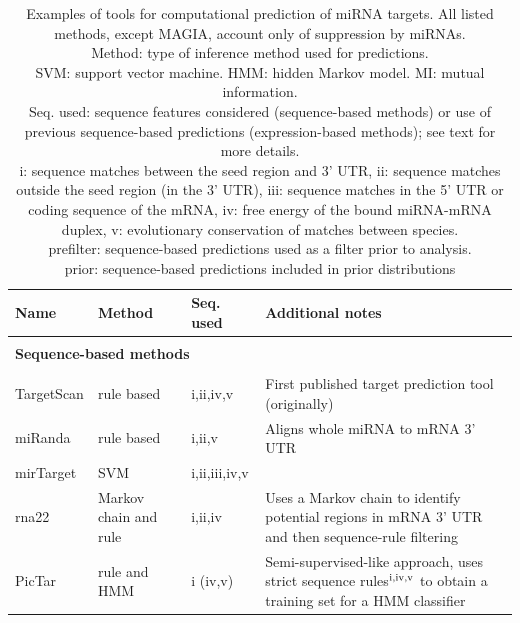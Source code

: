 \begin{table}
  \caption{Examples of tools for computational prediction of miRNA targets. All listed methods,
  except MAGIA, account only of suppression by miRNAs. \\
  Method: type of inference method used for predictions. \\
  SVM: support vector machine. HMM: hidden Markov model. MI: mutual information. \\
  Seq. used: sequence features considered (sequence-based methods) or use of
  previous sequence-based predictions (expression-based methods); see text for more details. \\
  i: sequence matches between the seed region and 3' UTR,
  ii: sequence matches outside the seed region (in the 3' UTR),
  iii: sequence matches in the 5' UTR or coding sequence of the mRNA,
  iv: free energy of the bound miRNA-mRNA duplex,
  v: evolutionary conservation of matches between species. \\
  prefilter: sequence-based predictions used as a filter prior to analysis. \\
  prior: sequence-based predictions included in prior distributions
  }
  \label{table:prediction-methods}
  {\fontsize{10pt}{13pt}\selectfont
  \begin{tabular}{ lp{3cm}lp{5cm} }
    \hline
    \textbf{Name} & \textbf{Method} & \textbf{Seq. used} & \textbf{Additional notes} \\
    \hline \\
    \multicolumn{4}{l}{\textbf{Sequence-based methods}} \\
    \\[-.3cm]
    TargetScan \citep{Agarwal2015}  & rule based            & i,ii,iv,v     & First published target prediction tool (originally) \\
    miRanda \citep{Betel2008}       & rule based            & i,ii,v        & Aligns whole miRNA to mRNA 3' UTR \\
    mirTarget \citep{Wang2008}      & SVM                   & i,ii,iii,iv,v &  \\
    rna22 \citep{Miranda2006}       & Markov chain and rule & i,ii,iv       & Uses a Markov chain to identify potential regions in mRNA 3' UTR and then sequence-rule filtering \\
    PicTar \citep{Krek2005}         & rule and HMM          & i (iv,v)      & Semi-supervised-like approach, uses strict sequence rules$^{\textup{i,iv,v}}$ to obtain a training set for a HMM classifier \\

\end{tabular}}
\end{table}
